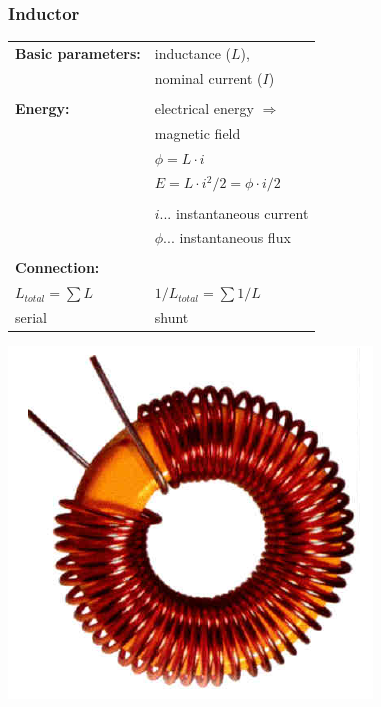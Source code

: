 \documentclass{beamer}
\begin{document}
	\begin{frame}
    \frametitle{Inductor}
		\begin{center}
		\begin{tabular}{l l}
			\textbf{Basic parameters:} 	& inductance ($L$),\\
																	& nominal current ($I$)\\ \\ \hline
			\textbf{Energy:}						& electrical energy $\Rightarrow$\\
																	& magnetic field\\
																	& $\phi = L\cdot i$\\
																	& $E = L\cdot i^2/ 2 = \phi \cdot i/2$\\\\
																	& $i$... instantaneous current\\
																	& $\phi$... instantaneous flux\\\\ \hline
		  \textbf{Connection:}				& \\
			$L_{total}= \sum{L}$				& $1/L_{total}= \sum{1/L}$\\
			serial											& shunt
		\end{tabular}
		\includegraphics[scale=0.2]{obr08_civka.png}
		\end{center}
  \end{frame}
\end{document}
